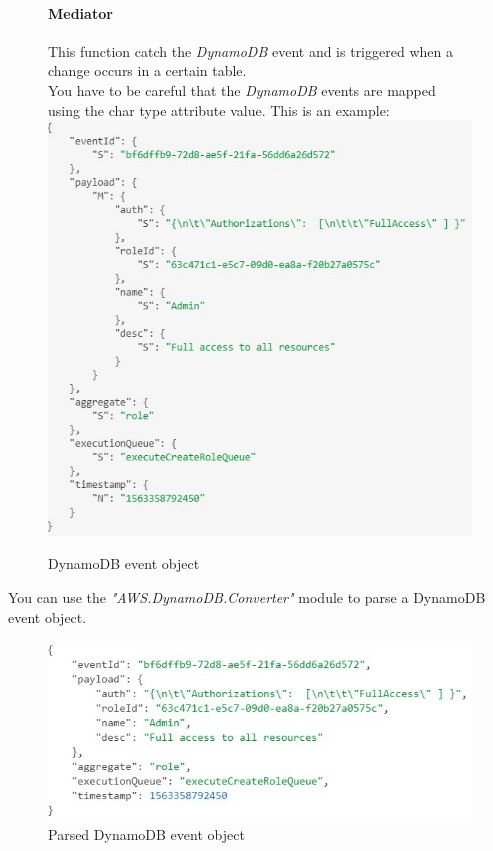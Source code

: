\begin{figure} [H]
\paragraph{Mediator} \Spazio
This function catch the \emph{DynamoDB} event and is triggered when a change occurs in a certain table. \\
You have to be careful that the \emph{DynamoDB} events are mapped using the char type attribute value. This is an example: \\

	\centering
	\includegraphics[scale=1]{../Img/dynamoEvent}
	\caption{DynamoDB event object}\label{}
\end{figure}

You can use the \emph{"AWS.DynamoDB.Converter"} module to parse a DynamoDB event object.

\begin{figure} [H]
	\centering
	\includegraphics[scale=1]{../Img/parsedDynamoEvent}
	\caption{Parsed DynamoDB event object}\label{}
\end{figure}

